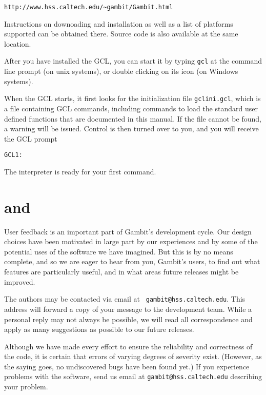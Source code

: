 \begin{verbatim}
http://www.hss.caltech.edu/~gambit/Gambit.html
\end{verbatim} 

\noindent Instructions on downoading and installation as well as a
list of platforms supported can be obtained there.  Source code is
also available at the same location. 

After you have installed the GCL, you can start it by typing
\verb+gcl+ at the command line prompt (on unix systems), or double
clicking on its icon (on Windows systems).

When the GCL starts, it first looks for the initialization file
\verb+gclini.gcl+, which is a file containing GCL commands, including
commands to load the standard user defined functions that are
documented in this manual.  If the file cannot be found, a warning
will be issued.  Control is then turned over to you, and you will
receive the GCL prompt

\begin{verbatim}
GCL1:
\end{verbatim}

\noindent The interpreter is ready for your first command.


\section{ and }

User feedback is an important part of Gambit's development cycle.  Our
design choices have been motivated in large part by our experiences
and by some of the potential uses of the software we have imagined.
But this is by no means complete, and so we are eager to hear from
you, Gambit's users, to find out what features are particularly
useful, and in what areas future releases might be improved.

The authors may be contacted via email at {\tt
gambit@hss.caltech.edu}.  This address will forward a copy of your
message to the development team.  While a personal reply may not
always be possible, we will read all correspondence and apply as many
suggestions as possible to our future releases.

Although we have made every effort to ensure the reliability and
correctness of the code, it is certain that errors of varying degrees
of severity exist.  (However, as the saying goes, no undiscovered bugs
have been found yet.)  If you experience problems with the software,
send us email at {\tt gambit@hss.caltech.edu} describing your problem.

